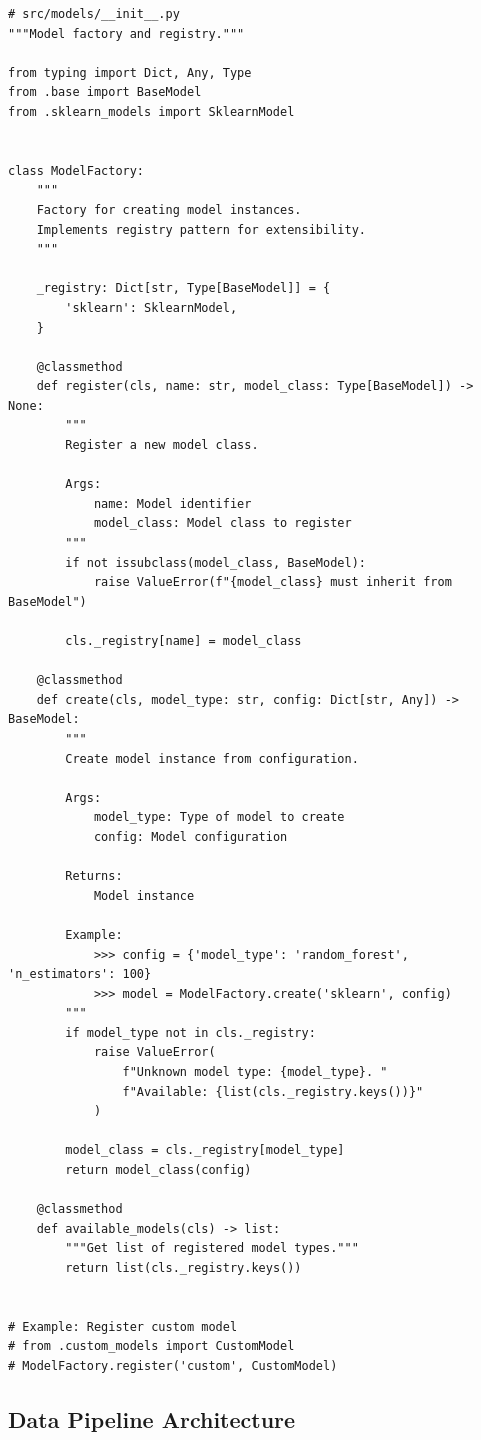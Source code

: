 \begin{lstlisting}[style=python, caption=Factory pattern for model creation]
# src/models/__init__.py
"""Model factory and registry."""

from typing import Dict, Any, Type
from .base import BaseModel
from .sklearn_models import SklearnModel


class ModelFactory:
    """
    Factory for creating model instances.
    Implements registry pattern for extensibility.
    """

    _registry: Dict[str, Type[BaseModel]] = {
        'sklearn': SklearnModel,
    }

    @classmethod
    def register(cls, name: str, model_class: Type[BaseModel]) -> None:
        """
        Register a new model class.

        Args:
            name: Model identifier
            model_class: Model class to register
        """
        if not issubclass(model_class, BaseModel):
            raise ValueError(f"{model_class} must inherit from BaseModel")

        cls._registry[name] = model_class

    @classmethod
    def create(cls, model_type: str, config: Dict[str, Any]) -> BaseModel:
        """
        Create model instance from configuration.

        Args:
            model_type: Type of model to create
            config: Model configuration

        Returns:
            Model instance

        Example:
            >>> config = {'model_type': 'random_forest', 'n_estimators': 100}
            >>> model = ModelFactory.create('sklearn', config)
        """
        if model_type not in cls._registry:
            raise ValueError(
                f"Unknown model type: {model_type}. "
                f"Available: {list(cls._registry.keys())}"
            )

        model_class = cls._registry[model_type]
        return model_class(config)

    @classmethod
    def available_models(cls) -> list:
        """Get list of registered model types."""
        return list(cls._registry.keys())


# Example: Register custom model
# from .custom_models import CustomModel
# ModelFactory.register('custom', CustomModel)
\end{lstlisting}

\subsection{Data Pipeline Architecture}

